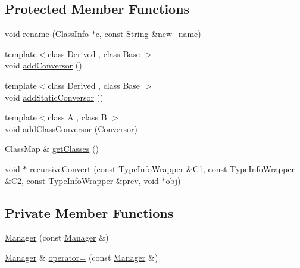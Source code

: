 \subsection*{Protected Member Functions}
\begin{DoxyCompactItemize}
\item 
void \hyperlink{classSLB_1_1Manager_a0c86ec04bd480017cb4646c306012c3c}{rename} (\hyperlink{classSLB_1_1ClassInfo}{Class\+Info} $\ast$c, const \hyperlink{namespaceSLB_a6a4c36e7004d99c0535c2c91c200c9a1}{String} \&new\+\_\+name)
\item 
{\footnotesize template$<$class Derived , class Base $>$ }\\void \hyperlink{classSLB_1_1Manager_aa0a3da34ea7236f45b0e8cf616eeb815}{add\+Conversor} ()
\item 
{\footnotesize template$<$class Derived , class Base $>$ }\\void \hyperlink{classSLB_1_1Manager_a09084e0443fadcb71c44255bcc54b032}{add\+Static\+Conversor} ()
\item 
{\footnotesize template$<$class A , class B $>$ }\\void \hyperlink{classSLB_1_1Manager_a4cd6ab9843179045e6e334a21d6c4070}{add\+Class\+Conversor} (\hyperlink{structSLB_1_1Conversor}{Conversor})
\item 
Class\+Map \& \hyperlink{classSLB_1_1Manager_ad9beb2f07927dc9fd66ef838b706c3cb}{get\+Classes} ()
\item 
void $\ast$ \hyperlink{classSLB_1_1Manager_a1f3d3f3726c6dae275dfed6e1818065e}{recursive\+Convert} (const \hyperlink{classSLB_1_1TypeInfoWrapper}{Type\+Info\+Wrapper} \&C1, const \hyperlink{classSLB_1_1TypeInfoWrapper}{Type\+Info\+Wrapper} \&C2, const \hyperlink{classSLB_1_1TypeInfoWrapper}{Type\+Info\+Wrapper} \&prev, void $\ast$obj)
\end{DoxyCompactItemize}
\subsection*{Private Member Functions}
\begin{DoxyCompactItemize}
\item 
\hyperlink{classSLB_1_1Manager_ae83c7f0f565a6b664846155ffe5891b7}{Manager} (const \hyperlink{classSLB_1_1Manager}{Manager} \&)
\item 
\hyperlink{classSLB_1_1Manager}{Manager} \& \hyperlink{classSLB_1_1Manager_aed026dacb1ed583244a0682f9195c381}{operator=} (const \hyperlink{classSLB_1_1Manager}{Manager} \&)
\end{DoxyCompactItemize}
